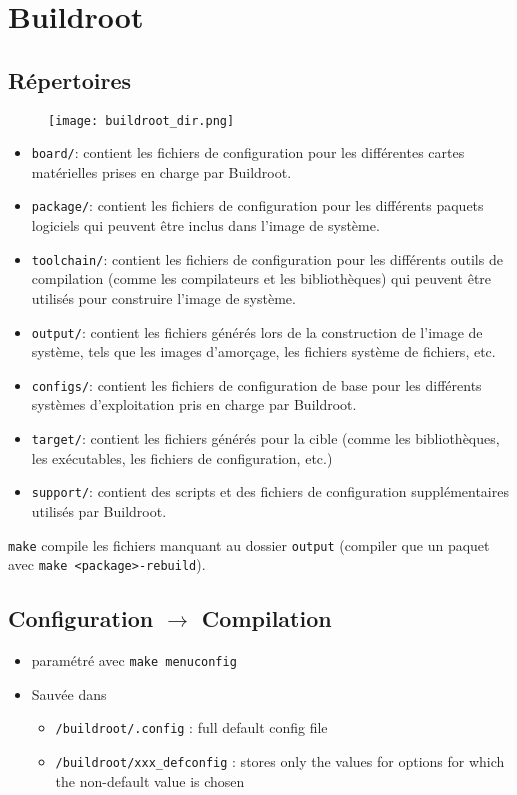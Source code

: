 \section{Buildroot}
\subsection{Répertoires}
\begin{figure}[H]
    \centering
    \texttt{[image: buildroot\_dir.png]}
\end{figure}

\begin{itemize}
\item \texttt{board/}: contient les fichiers de configuration pour les différentes cartes matérielles prises en charge par Buildroot.
\item \texttt{package/}: contient les fichiers de configuration pour les différents paquets logiciels qui peuvent être inclus dans l'image de système.
\item \texttt{toolchain/}: contient les fichiers de configuration pour les différents outils de compilation (comme les compilateurs et les bibliothèques) qui peuvent être utilisés pour construire l'image de système.
\item \texttt{output/}: contient les fichiers générés lors de la construction de l'image de système, tels que les images d'amorçage, les fichiers système de fichiers, etc.
\item \texttt{configs/}: contient les fichiers de configuration de base pour les différents systèmes d'exploitation pris en charge par Buildroot.
\item \texttt{target/}: contient les fichiers générés pour la cible (comme les bibliothèques, les exécutables, les fichiers de configuration, etc.)
\item \texttt{support/}: contient des scripts et des fichiers de configuration supplémentaires utilisés par Buildroot.
\end{itemize}

\verb+make+ compile les fichiers manquant au dossier \verb+output+ (compiler que un paquet avec \verb+make <package>-rebuild+).
%
\subsection{Configuration $\rightarrow$ Compilation}
\begin{itemize}
    \item paramétré avec \verb+make menuconfig+

    \item Sauvée dans \begin{itemize}
        \item \verb+/buildroot/.config+ : full default config file
        \item \verb+/buildroot/xxx_defconfig+ : stores only the values for options for which the non-default value is chosen
        \end{itemize}
\end{itemize}

